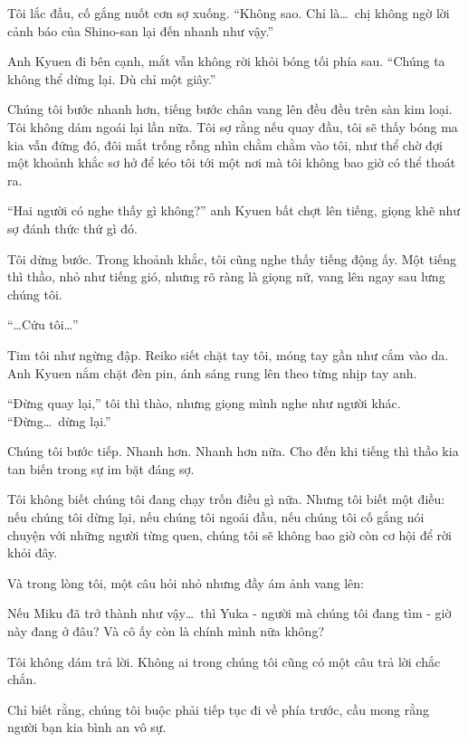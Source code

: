 \documentclass[../main.tex]{subfiles}
\begin{document}
Tôi lắc đầu, cố gắng nuốt cơn sợ xuống. ``Không sao. Chỉ là\dots\ chị không ngờ lời cảnh báo của Shino-san lại đến nhanh như vậy.''

Anh Kyuen đi bên cạnh, mắt vẫn không rời khỏi bóng tối phía sau. ``Chúng ta không thể dừng lại. Dù chỉ một giây.''

Chúng tôi bước nhanh hơn, tiếng bước chân vang lên đều đều trên sàn kim loại. Tôi không dám ngoái lại lần nữa. Tôi sợ rằng nếu quay đầu, tôi sẽ thấy bóng ma kia vẫn đứng đó, đôi mắt trống rỗng nhìn chằm chằm vào tôi, như thể chờ đợi một khoảnh khắc sơ hở để kéo tôi tới một nơi mà tôi không bao giờ có thể thoát ra.

``Hai người có nghe thấy gì không?'' anh Kyuen bất chợt lên tiếng, giọng khẽ như sợ đánh thức thứ gì đó.

Tôi dừng bước. Trong khoảnh khắc, tôi cũng nghe thấy tiếng động ấy. Một tiếng thì thầo, nhỏ như tiếng gió, nhưng rõ ràng là giọng nữ, vang lên ngay sau lưng chúng tôi.

``\dots Cứu tôi\dots''

Tim tôi như ngừng đập. Reiko siết chặt tay tôi, móng tay gần như cắm vào da. Anh Kyuen nắm chặt đèn pin, ánh sáng rung lên theo từng nhịp tay anh.

``Đừng quay lại,'' tôi thì thào, nhưng giọng mình nghe như người khác. ``Đừng\dots\ dừng lại.''

Chúng tôi bước tiếp. Nhanh hơn. Nhanh hơn nữa. Cho đến khi tiếng thì thầo kia tan biến trong sự im bặt đáng sợ.

Tôi không biết chúng tôi đang chạy trốn điều gì nữa. Nhưng tôi biết một điều: nếu chúng tôi dừng lại, nếu chúng tôi ngoái đầu, nếu chúng tôi cố gắng nói chuyện với những người từng quen, chúng tôi sẽ không bao giờ còn cơ hội để rời khỏi đây.

Và trong lòng tôi, một câu hỏi nhỏ nhưng đầy ám ảnh vang lên:

Nếu Miku đã trở thành như vậy\dots\ thì Yuka - người mà chúng tôi đang tìm - giờ này đang ở đâu? Và cô ấy còn là chính mình nữa không?

Tôi không dám trả lời. Không ai trong chúng tôi cũng có một câu trả lời chắc chắn.

Chỉ biết rằng, chúng tôi buộc phải tiếp tục đi về phía trước, cầu mong rằng người bạn kia bình an vô sự.
\end{document}
